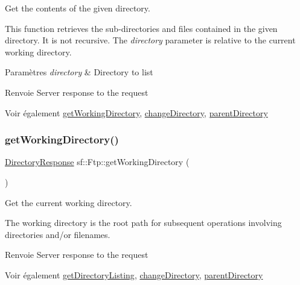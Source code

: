 Get the contents of the given directory. 

This function retrieves the sub-\/directories and files contained in the given directory. It is not recursive. The {\itshape directory} parameter is relative to the current working directory.


\begin{DoxyParams}{Paramètres}
{\em directory} & Directory to list\\
\hline
\end{DoxyParams}
\begin{DoxyReturn}{Renvoie}
Server response to the request
\end{DoxyReturn}
\begin{DoxySeeAlso}{Voir également}
\hyperlink{classsf_1_1Ftp_a79c654fcdd0c81e68c4fa29af3b45e0c}{get\+Working\+Directory}, \hyperlink{classsf_1_1Ftp_a7e93488ea6330dd4dd76e428da9bb6d3}{change\+Directory}, \hyperlink{classsf_1_1Ftp_ad295cf77f30f9ad07b5c401fd9849189}{parent\+Directory} 
\end{DoxySeeAlso}
\mbox{\label{classsf_1_1Ftp_a79c654fcdd0c81e68c4fa29af3b45e0c}} 
\subsubsection{\texorpdfstring{get\+Working\+Directory()}{getWorkingDirectory()}}
{\footnotesize\ttfamily \hyperlink{classsf_1_1Ftp_1_1DirectoryResponse}{Directory\+Response} sf\+::\+Ftp\+::get\+Working\+Directory (\begin{DoxyParamCaption}{ }\end{DoxyParamCaption})}



Get the current working directory. 

The working directory is the root path for subsequent operations involving directories and/or filenames.

\begin{DoxyReturn}{Renvoie}
Server response to the request
\end{DoxyReturn}
\begin{DoxySeeAlso}{Voir également}
\hyperlink{classsf_1_1Ftp_a8f37258e461fcb9e2a0655e9df0be4a0}{get\+Directory\+Listing}, \hyperlink{classsf_1_1Ftp_a7e93488ea6330dd4dd76e428da9bb6d3}{change\+Directory}, \hyperlink{classsf_1_1Ftp_ad295cf77f30f9ad07b5c401fd9849189}{parent\+Directory} 
\end{DoxySeeAlso}
\mbox{\label{classsf_1_1Ftp_aa1127d442b4acb2105aa8060a39d04fc}} 
